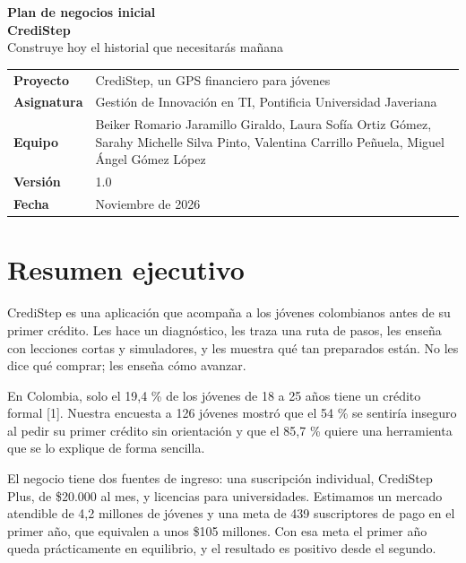 \documentclass[11pt,a4paper]{article}
\begin{document}
\sloppy

\begin{center}
  {\Huge\bfseries Plan de negocios inicial} \\[0.4cm]
  {\LARGE\bfseries CrediStep} \\[0.3cm]
  {\large Construye hoy el historial que necesitarás mañana} \\[0.8cm]
\end{center}

\begin{tabularx}{\textwidth}{>{\bfseries}l X}
  \toprule
  Proyecto     & CrediStep, un GPS financiero para jóvenes \\
  Asignatura   & Gestión de Innovación en TI, Pontificia Universidad Javeriana \\
  Equipo       & Beiker Romario Jaramillo Giraldo, Laura Sofía Ortiz Gómez, Sarahy Michelle Silva Pinto, Valentina Carrillo Peñuela, Miguel Ángel Gómez López \\
  Versión      & 1.0 \\
  Fecha        & Noviembre de 2026 \\
  \bottomrule
\end{tabularx}

\section{Resumen ejecutivo}

\begin{resumen}
  CrediStep es una aplicación que acompaña a los jóvenes colombianos antes de su primer
  crédito. Les hace un diagnóstico, les traza una ruta de pasos, les enseña con lecciones
  cortas y simuladores, y les muestra qué tan preparados están. No les dice qué comprar;
  les enseña cómo avanzar.
\end{resumen}

En Colombia, solo el 19,4 \% de los jóvenes de 18 a 25 años tiene un crédito formal [1]. Nuestra encuesta a 126 jóvenes mostró que el 54 \% se sentiría inseguro al pedir su primer crédito sin orientación y que el 85,7 \% quiere una herramienta que se lo explique de forma sencilla.

El negocio tiene dos fuentes de ingreso: una suscripción individual, CrediStep Plus, de \$20.000 al mes, y licencias para universidades. Estimamos un mercado atendible de 4,2 millones de jóvenes y una meta de 439 suscriptores de pago en el primer año, que equivalen a unos \$105 millones. Con esa meta el primer año queda prácticamente en equilibrio, y el resultado es positivo desde el segundo.
\end{document}
